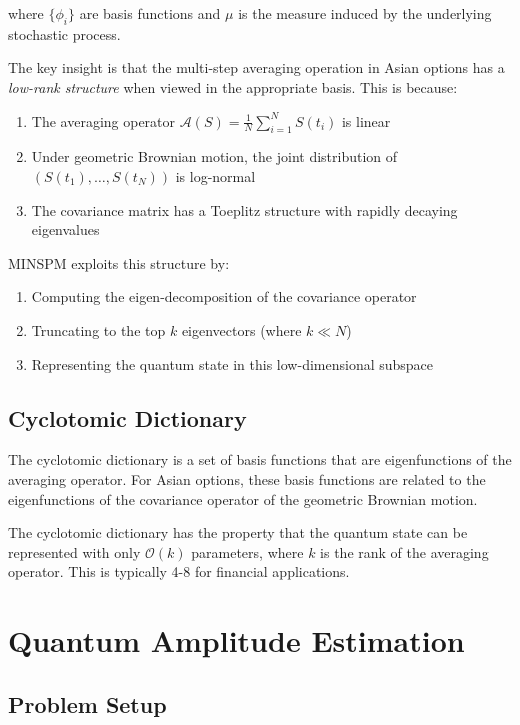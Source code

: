 \documentclass[12pt]{article}
\begin{document}
where $\{\phi_i\}$ are basis functions and $\mu$ is the measure induced by the underlying stochastic process.

The key insight is that the multi-step averaging operation in Asian options has a \textit{low-rank structure} when viewed in the appropriate basis. This is because:

\begin{enumerate}
    \item The averaging operator $\mathcal{A}(S) = \frac{1}{N}\sum_{i=1}^{N} S(t_i)$ is linear
    \item Under geometric Brownian motion, the joint distribution of $(S(t_1), \dots, S(t_N))$ is log-normal
    \item The covariance matrix has a Toeplitz structure with rapidly decaying eigenvalues
\end{enumerate}

MINSPM exploits this structure by:
\begin{enumerate}
    \item Computing the eigen-decomposition of the covariance operator
    \item Truncating to the top $k$ eigenvectors (where $k \ll N$)
    \item Representing the quantum state in this low-dimensional subspace
\end{enumerate}

\subsection{Cyclotomic Dictionary}

The cyclotomic dictionary is a set of basis functions that are eigenfunctions of the averaging operator. For Asian options, these basis functions are related to the eigenfunctions of the covariance operator of the geometric Brownian motion.

The cyclotomic dictionary has the property that the quantum state can be represented with only $\mathcal{O}(k)$ parameters, where $k$ is the rank of the averaging operator. This is typically 4-8 for financial applications.

\section{Quantum Amplitude Estimation}

\subsection{Problem Setup}
\end{document}
